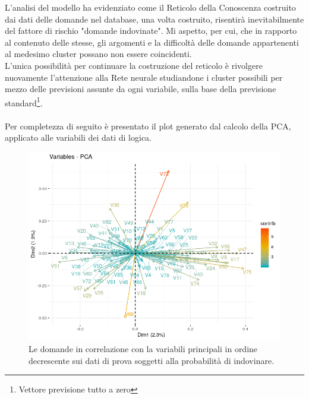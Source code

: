 \noindent L'analisi del modello ha evidenziato come il Reticolo della Conoscenza costruito  dai dati delle domande nel database, una volta costruito, risentir\`a inevitabilmente del fattore di rischio "domande indovinate". Mi aspetto, per cui, che in rapporto al contenuto delle stesse, gli argomenti e la difficolt\`a  delle domande appartenenti al medesimo cluster possano non essere coincidenti.\\
L'unica possibilit\`a per continuare la costruzione del reticolo \`e rivolgere nuovamente l'attenzione alla Rete neurale studiandone i cluster possibili per mezzo delle previsioni assunte da ogni variabile, sulla base della previsione standard\footnote{Vettore previsione tutto a zero}.\\\\
\noindent
Per completezza di seguito \`e presentato il plot generato dal calcolo della PCA, applicato alle variabili dei dati di logica.
\begin{figure}[H]
\centering
	\includegraphics[width=1\linewidth]{../../PCA/plot/PCA_domande-logica.png}
	\caption{Le domande in correlazione con la variabili principali in ordine decrescente sui dati di prova soggetti alla probabilità di indovinare.}
	\label{Rappresentazione per mezzo di plot di come le variabili si presentano nelle due componenti principali con il calcolo della PCA - utilizzo del set delle domande di logica.}
\end{figure}